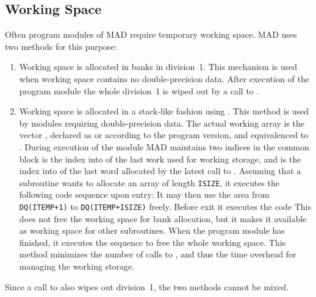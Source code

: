 \subsection{Working Space}
\label{work}
Often program modules of MAD require temporary working space.
MAD uses two methods for this purpose:
\begin{enumerate}
\item
Working space is allocated in banks in division~1.
This mechanism is used when working space contains no double-precision
data. 
After execution of the program module the whole division~1
is wiped out by a call to .
\item
{}
Working space is allocated in a stack-like fashion using
.
This method is used by modules requiring double-precision data.
The actual working array is the vector ,
declared as  or  according to the
program version, 
and equivalenced to .
During execution of the module MAD maintains two indices in the
common block
 is the index into 
of the last work used for working storage,
and  is the index into  of the last word
allocated by the latest call to .
Assuming that a subroutine wants to allocate an array of length
{\tt ISIZE}, it executes the following code sequence upon entry:
It may then use the area from {\tt DQ(ITEMP+1)} to
{\tt DQ(ITEMP+ISIZE)} freely. 
Before exit it executes the code
This does not free the working space for bank allocation,
but it makes it available as working space for other subroutines.
When the program module has finished, it executes the sequence
to free the whole working space.
This method minimizes the number of calls to ,
and thus the time overhead for managing the working storage.
\end{enumerate}
Since a call to  also wipes out division~1,
the two methods cannot be mixed.
 
